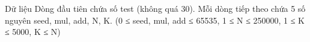 Dữ liệu
Dòng đầu tiên chứa số test (không quá 30). Mỗi dòng tiếp theo chứa 5 số nguyên seed, mul, add, N, K. (0 ≤ seed, mul, add ≤ 65535, 1 ≤ N ≤ 250000, 1 ≤ K ≤ 5000, K ≤ N)